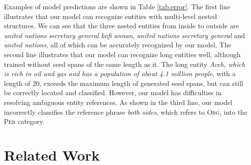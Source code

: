 \documentclass[11pt,a4paper]{article}
\begin{document}
Examples of model predictions are shown in Table \ref{tab:error}. The first line illustrates that our model can recognize entities with multi-level nested structures. We can see that the three nested entities from inside to outside are {\textit{united nations secretary general kofi annan}}, {\textit{united nations secretary general}} and {\textit{united nations}}, all of which can be accurately recognized by our model. The second line illustrates that our model can recognize long entities well, although trained without seed spans of the same length as it. The long entity {\textit{Aceh, which is rich in oil and gas and has a  population of about 4.1 million people}}, with a length of 20, exceeds the maximum length of generated seed spans, but can still be correctly located and classified.
However, our model has difficulties in resolving ambiguous entity references. As shown in the third line, our model incorrectly classifies the reference phrase \textit{both sides}, which refers to \textsc{Org}, into the \textsc{Per} category.









\section{Related Work}
\end{document}
